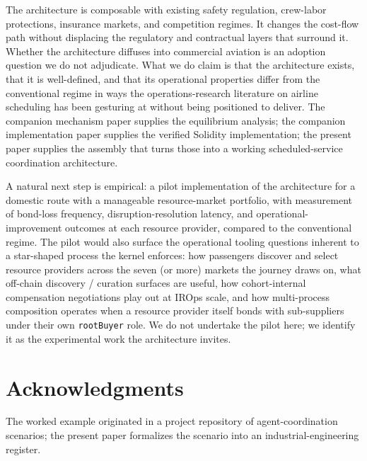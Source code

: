 \documentclass[11pt,a4paper]{article}
\theoremstyle{definition}
\theoremstyle{remark}
\begin{document}
The architecture is composable with existing safety regulation,
crew-labor protections, insurance markets, and competition
regimes. It changes the cost-flow path without displacing the
regulatory and contractual layers that surround it. Whether the
architecture diffuses into commercial aviation is an adoption
question we do not adjudicate. What we do claim is that the
architecture exists, that it is well-defined, and that its
operational properties differ from the conventional regime in
ways the operations-research literature on airline scheduling has
been gesturing at without being positioned to deliver. The
companion mechanism paper supplies the equilibrium analysis; the
companion implementation paper supplies the verified Solidity
implementation; the present paper supplies the assembly that
turns those into a working scheduled-service coordination
architecture.

A natural next step is empirical: a pilot implementation of the
architecture for a domestic route with a manageable resource-market
portfolio, with measurement of bond-loss frequency,
disruption-resolution latency, and operational-improvement
outcomes at each resource provider, compared to the conventional
regime. The pilot would also surface the operational tooling
questions inherent to a star-shaped process the kernel enforces:
how passengers discover and select resource providers across the
seven (or more) markets the journey draws on, what off-chain
discovery / curation surfaces are useful, how cohort-internal
compensation negotiations play out at IROps scale, and how
multi-process composition operates when a resource provider
itself bonds with sub-suppliers under their own
\texttt{rootBuyer} role. We do not undertake the pilot here; we
identify it as the experimental work the architecture invites.

\section*{Acknowledgments}
The worked example originated in a project repository of
agent-coordination scenarios; the present paper formalizes the
scenario into an industrial-engineering register.
\end{document}
